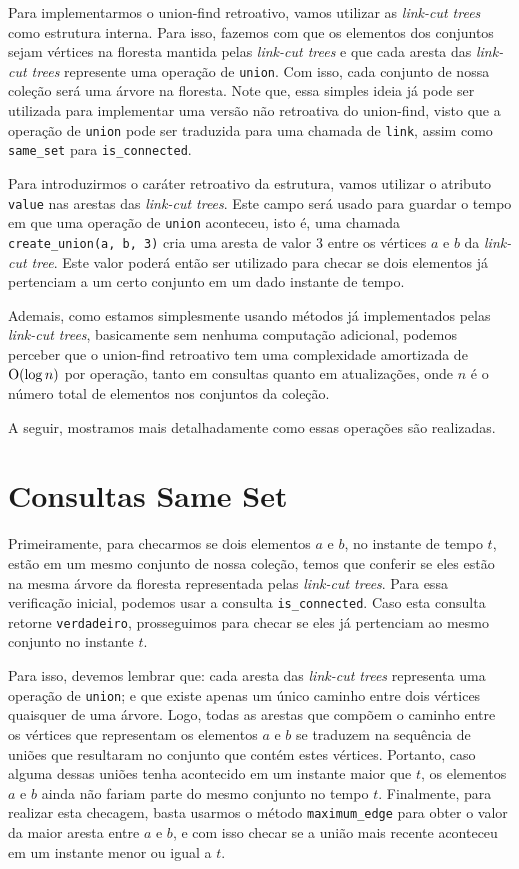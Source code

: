 Para implementarmos o union-find retroativo, vamos utilizar as \emph{link-cut trees} como estrutura interna. Para isso, fazemos com que os elementos dos conjuntos sejam vértices na floresta mantida pelas \emph{link-cut trees} e que cada aresta das \emph{link-cut trees} represente uma operação de \texttt{union}. Com isso, cada conjunto de nossa coleção será uma árvore na floresta. Note que, essa simples ideia já pode ser utilizada para implementar uma versão não retroativa do union-find, visto que a operação de \texttt{union} pode ser traduzida para uma chamada de \texttt{link}, assim como \texttt{same\_set} para \texttt{is\_connected}.

Para introduzirmos o caráter retroativo da estrutura, vamos utilizar o atributo \texttt{value} nas arestas das \emph{link-cut trees}. Este campo será usado para guardar o tempo em que uma operação de \texttt{union} aconteceu, isto é, uma chamada \texttt{create\_union(a, b, 3)} cria uma aresta de valor $3$ entre os vértices $a$ e $b$ da \emph{link-cut tree}. Este valor poderá então ser utilizado para checar se dois elementos já pertenciam a um certo conjunto em um dado instante de tempo.

Ademais, como estamos simplesmente usando métodos já implementados pelas \emph{link-cut trees}, basicamente sem nenhuma computação adicional, podemos perceber que o union-find retroativo tem uma complexidade amortizada de $\mathrm{O}(\log n)$ por operação, tanto em consultas quanto em atualizações, onde $n$ é o número total de elementos nos conjuntos da coleção.

A seguir, mostramos mais detalhadamente como essas operações são realizadas.

\section{Consultas Same Set}
\label{sec:uf-same-set}

Primeiramente, para checarmos se dois elementos $a$ e $b$, no instante de tempo $t$, estão em um mesmo conjunto de nossa coleção, temos que conferir se eles estão na mesma árvore da floresta representada pelas \emph{link-cut trees}. Para essa verificação inicial, podemos usar a consulta \texttt{is\_connected}. Caso esta consulta retorne \texttt{verdadeiro}, prosseguimos para checar se eles já pertenciam ao mesmo conjunto no instante $t$.

Para isso, devemos lembrar que: cada aresta das \emph{link-cut trees} representa uma operação de \texttt{union}; e que existe apenas um único caminho entre dois vértices quaisquer de uma árvore. Logo, todas as arestas que compõem o caminho entre os vértices que representam os elementos $a$ e $b$ se traduzem na sequência de uniões que resultaram no conjunto que contém estes vértices. Portanto, caso alguma dessas uniões tenha acontecido em um instante maior que $t$, os elementos $a$ e $b$ ainda não fariam parte do mesmo conjunto no tempo $t$. Finalmente, para realizar esta checagem, basta usarmos o método \texttt{maximum\_edge} para obter o valor da maior aresta entre $a$ e $b$, e com isso checar se a união mais recente aconteceu em um instante menor ou igual a $t$.

